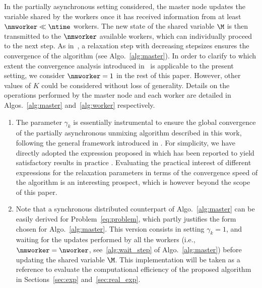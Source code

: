 \documentclass[journal,final,letterpaper,twoside,twocolumn]{IEEEtran}
\begin{document}
In the partially asynchronous setting considered, the master node updates the variable shared by the workers once it has received information from at least $\nmworker \ll \ntime$ workers. The new state of the shared variable $\M$ is then transmitted to the $\nmworker$ available workers, which can individually proceed to the next step. As in~\cite{Cannelli2016}, a relaxation step with decreasing stepsizes ensures the convergence of the algorithm (see Algo.~\ref{alg:master}). In order to clarify to which extent the convergence analysis introduced in~\cite{Cannelli2016} is applicable to the present setting, we consider $\nmworker = 1$ in the rest of this paper. However, other values of $K$ could be considered without loss of generality. Details on the operations performed by the master node and each worker are detailed in Algos.~\ref{alg:master} and~\ref{alg:worker} respectively.

\begin{remark}
\begin{enumerate}[label=(\alph*)]
\item The parameter $\gamma_k$ is essentially instrumental to ensure the global convergence of the partially asynchronous unmixing algorithm described in this work, following the general framework introduced in \cite{Cannelli2016}. For simplicity, we have directly adopted the expression proposed in \cite{Scutari2017} \cite[Assumption D., p. 18]{Cannelli2016} which has been reported to yield satisfactory results in practice \cite{Scutari2017}. Evaluating the practical interest of different expressions for the relaxation parameters in terms of the convergence speed of the algorithm is an interesting prospect, which is however beyond the scope of this paper.
%
\item Note that a synchronous distributed counterpart of Algo.~\ref{alg:master} can be easily derived for Problem~\eqref{eq:problem}, which partly justifies the form chosen for Algo.~\ref{alg:master}. This version consists in setting $\gamma_k = 1$, and waiting for the updates performed by all the workers (i.e., $\nmworker = \nworker$, see~\ref{alg:wait_step} of Algo.~\ref{alg:master}) before updating the shared variable $\M$. This implementation will be taken as a reference to evaluate the computational efficiency of the proposed algorithm in Sections~\ref{sec:exp} and~\ref{sec:real_exp}. 
\end{enumerate}
\end{remark}


\end{document}
